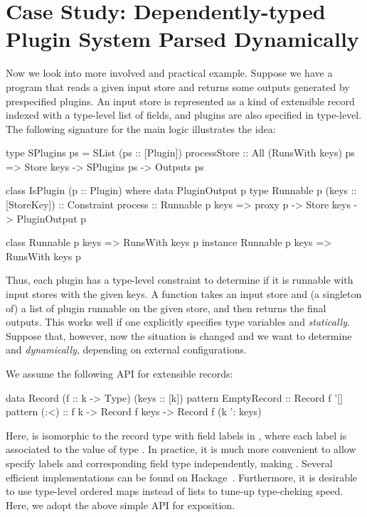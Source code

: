\documentclass[demotion-paper.tex]{subfiles}
\begin{document}
\section{Case Study: Dependently-typed Plugin System Parsed Dynamically}
Now we look into more involved and practical example.
Suppose we have a program that reads a given input store and returns some outputs generated by prespecified plugins.
An input store is represented as a kind of extensible record indexed with a type-level list of fields, and plugins are also specified in type-level.
The following signature for the main logic illustrates the idea:
\begin{code}
type SPlugins ps = SList (ps :: [Plugin])
processStore :: All (RunsWith keys) ps
             => Store keys -> SPlugins ps -> Outputs ps

class IsPlugin (p :: Plugin) where
  data PluginOutput p
  type Runnable p (keys :: [StoreKey]) :: Constraint
  process :: Runnable p keys => proxy p -> Store keys -> PluginOutput p

class Runnable p keys => RunsWith keys p
instance Runnable p keys => RunsWith keys p
\end{code}
Thus, each plugin has a type-level constraint to determine if it is runnable with input stores with the given keys.
A function  takes an input store and (a singleton of) a list of plugin runnable on the given store, and then returns the final outputs.
This works well if one explicitly specifies type variables  and  \emph{statically}.
Suppose that, however, now the situation is changed and we want to determine  and  \emph{dynamically}, depending on external configurations.

We assume the following API for extensible records:

\begin{code}
data Record (f :: k -> Type) (keys :: [k])
pattern EmptyRecord :: Record f '[]
pattern (:<) :: f k -> Record f keys -> Record f (k ': keys)
\end{code}

Here,  is isomorphic to the record type with field labels in , where each label  is associated to the value of type .
In practice, it is much more convenient to allow specify labels and corresponding field type independently, making .
Several efficient implementations can be found on Hackage~\cite{Kinoshita:2020aa,Sterling:2020aa,Thiemann:2020aa}.
Furthermore, it is desirable to use type-level ordered maps instead of lists to tune-up type-cheking speed.
Here, we adopt the above simple API for exposition.
\end{document}
